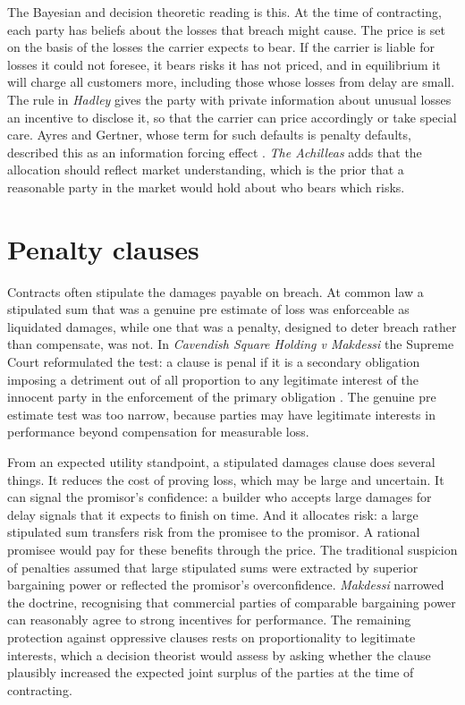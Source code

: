 The Bayesian and decision theoretic reading is this. At the time of contracting, each party has beliefs about the losses that breach might cause. The price is set on the basis of the losses the carrier expects to bear. If the carrier is liable for losses it could not foresee, it bears risks it has not priced, and in equilibrium it will charge all customers more, including those whose losses from delay are small. The rule in \emph{Hadley} gives the party with private information about unusual losses an incentive to disclose it, so that the carrier can price accordingly or take special care. Ayres and Gertner, whose term for such defaults is penalty defaults, described this as an information forcing effect \citep{ayres1989}. \emph{The Achilleas} adds that the allocation should reflect market understanding, which is the prior that a reasonable party in the market would hold about who bears which risks.

\section{Penalty clauses}

Contracts often stipulate the damages payable on breach. At common law a stipulated sum that was a genuine pre estimate of loss was enforceable as liquidated damages, while one that was a penalty, designed to deter breach rather than compensate, was not. In \emph{Cavendish Square Holding v Makdessi} the Supreme Court reformulated the test: a clause is penal if it is a secondary obligation imposing a detriment out of all proportion to any legitimate interest of the innocent party in the enforcement of the primary obligation \citep{cavendish2015}. The genuine pre estimate test was too narrow, because parties may have legitimate interests in performance beyond compensation for measurable loss.

From an expected utility standpoint, a stipulated damages clause does several things. It reduces the cost of proving loss, which may be large and uncertain. It can signal the promisor's confidence: a builder who accepts large damages for delay signals that it expects to finish on time. And it allocates risk: a large stipulated sum transfers risk from the promisee to the promisor. A rational promisee would pay for these benefits through the price. The traditional suspicion of penalties assumed that large stipulated sums were extracted by superior bargaining power or reflected the promisor's overconfidence. \emph{Makdessi} narrowed the doctrine, recognising that commercial parties of comparable bargaining power can reasonably agree to strong incentives for performance. The remaining protection against oppressive clauses rests on proportionality to legitimate interests, which a decision theorist would assess by asking whether the clause plausibly increased the expected joint surplus of the parties at the time of contracting.

